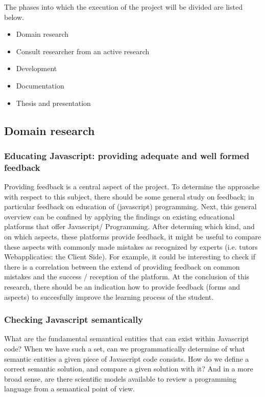 \documentclass{article}
\begin{document}
The phases into which the execution of the project will be divided are listed
below.

\begin{itemize}
  \item Domain research
  \item Consult researcher from an active research
  \item Development
  \item Documentation
  \item Thesis and presentation
\end{itemize}


\subsection{Domain research}

\subsubsection{Educating Javascript: providing adequate and well formed feedback }
Providing feedback is a central aspect of the project. To determine the approache
with respect to this subject, there should be some general study on feedback; in particular 
feedback on education of (javascript) programming. Next, this general overview can be
confined by applying the findings on existing educational platforms that offer Javascript/
Programming. After determing which kind, and on which aspects, these platforms provide 
feedback, it might be useful to compare these aspects with commonly made mistakes as 
recognized by experts (i.e. tutors Webapplicaties: the Client Side). For example, it could be interesting to
check if there is a correlation between the extend of providing feedback on common mistakes
and the success / reception of the platform. At the conclusion of this research, there
should be an indication how to provide feedback (forms and aspects) to 
succesfully improve the learning process of the student.

\subsubsection{Checking Javascript semantically}
What are the fundamental semantical entities that can exist within Javascript
code? When we have such a set, can we programmatically determine of what
semantic entities a given piece of Javascript code consists. How do we define a
correct semantic solution, and compare a given solution with it? And in a more
broad sense, are there scientific models available to review a programming
language from a semantical point of view.
\end{document}
